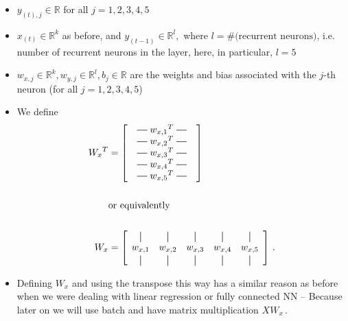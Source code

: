 \documentclass{article}
\newcommand*{\vertbar}{\rule[-1ex]{0.5pt}{2.5ex}}
\newcommand*{\horzbar}{\rule[.5ex]{2.5ex}{0.5pt}}
\begin{document}
\begin{itemize}
  \item $y_{(t), j} \in \mathbb{R}$ for all $j=1,2,3,4,5$
  \item $x_{(t)} \in \mathbb{R}^{k}$ as before, and $y_{(t-1)} \in \mathbb{R}^{l},$ where $l = \text{\#(recurrent neurons)}$, i.e. number of recurrent neurons in the layer, here, in particular, $l=5$
  \item $w_{x,j} \in \mathbb{R}^k, w_{y,j} \in \mathbb{R}^l, b_{j} \in \mathbb{R}$ are the weights and bias associated with the $j$-th neuron (for all $j=1,2,3,4,5$)
  \item We define
    \begin{align*}
      {W_x}^{T} &= \begin{bmatrix}
        \quad\horzbar\;{w_{x,1}}^T{}\;\horzbar\quad \\
        \quad\horzbar\;{w_{x,2}}^T{}\;\horzbar\quad \\
        \quad\horzbar\;{w_{x,3}}^T{}\;\horzbar\quad \\
        \quad\horzbar\;{w_{x,4}}^T{}\;\horzbar\quad \\
        \quad\horzbar\;{w_{x,5}}^T{}\;\horzbar\quad \\
      \end{bmatrix} \\
      \\
      \qquad &{}\text{or equivalently} \\
      \\
      {W_x} &= \begin{bmatrix}
        \;\,\vertbar & \vertbar & \vertbar & \vertbar & \vertbar \;\, \\
        \;\, w_{x,1} & w_{x,2} & w_{x,3} & w_{x,4} & w_{x,5}     \;\, \\
        \;\,\vertbar & \vertbar & \vertbar & \vertbar & \vertbar \;\,
      \end{bmatrix}\,.
    \end{align*}
  \item Defining $W_x$ and using the transpose this way has a similar reason as before when we were dealing with linear regression or fully connected NN -- Because later on we will use batch and have matrix multiplication $X W_x\,.$

\end{itemize}
\end{document}
